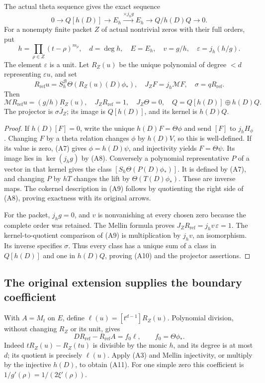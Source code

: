 \begin{theorem}
The actual theta sequence gives the exact sequence
\[
 0\longrightarrow Q[h(D)]\longrightarrow E_h
       \xrightarrow{\times j_hg}E_h
       \longrightarrow Q/h(D)Q\longrightarrow0 .
 \tag{A9}
\]
For a nonempty finite packet \(Z\) of actual nontrivial zeros
with their full orders,
put
\[
 h=\prod_{\rho\in Z}(t-\rho)^{m_\rho},\quad d=\deg h,\quad
 E=E_h,\quad v=g/h,\quad \varepsilon=j_h(h/g).
\]
The element \(\varepsilon\) is a unit. Let \(R_Z(u)\) be the unique
polynomial of degree \(<d\) representing \(\varepsilon u\), and set
\[
 R_{\mathrm{ref}}u=S_h^{\mathscr B}\Theta(R_Z(u)(D)\phi_*),\quad
 J_ZF=j_h\mathcal MF,\quad \sigma=qR_{\mathrm{ref}} .
\]
Then
\[
 \mathcal M R_{\mathrm{ref}}u=(g/h)R_Z(u),\quad J_ZR_{\mathrm{ref}}=1,\quad J_Z\Theta=0,
 \quad Q=Q[h(D)]\oplus h(D)Q .
 \tag{A10}
\]
The projector is \(\sigma\overline J_Z\); its image is \(Q[h(D)]\),
and its kernel is \(h(D)Q\).
\end{theorem}
\begin{proof}
If \(h(D)[F]=0\), write the unique
\(h(D)F=\Theta\phi\) and send \([F]\) to \(j_hH_\phi\).
Changing \(F\) by a theta relation changes \(\phi\) by \(h(D)V\),
so this is well-defined. If its value is zero, (A7) gives
\(\phi=h(D)\psi\), and injectivity yields \(F=\Theta\psi\).
Its image lies in \(\ker(j_hg)\) by (A8).
Conversely a polynomial representative \(P\) of a vector in that
kernel gives the class \([S_h\Theta(P(D)\phi_*)]\).
It is defined by (A7), and changing \(P\) by \(hT\) changes the lift
by \(\Theta(T(D)\phi_*)\). These are inverse maps.
The cokernel description in (A9) follows by quotienting the
right side of (A8), proving exactness with its original arrows.

For the packet, \(j_hg=0\), and \(v\) is nonvanishing at every
chosen zero because the complete order was retained. The Mellin
formula proves \(J_ZR_{\mathrm{ref}}=j_hv\,\varepsilon=1\).
The kernel-to-quotient comparison of (A9) is multiplication by
\(j_hv\), an isomorphism. Its inverse specifies \(\sigma\).
Thus every class has a unique sum of a class in \(Q[h(D)]\)
and one in \(h(D)Q\), proving (A10) and the projector assertions.
\end{proof}

\subsection{The original extension supplies the boundary coefficient}
With \(A=M_t\) on \(E\), define
\(\ell(u)=[t^{d-1}]R_Z(u)\).
Polynomial division, without changing \(R_Z\) or its unit, gives
\[
 DR_{\mathrm{ref}}-R_{\mathrm{ref}}A=f_0\ell,\qquad f_0=\Theta\phi_* .
 \tag{A11}
\]
Indeed \(tR_Z(u)-R_Z(tu)\) is divisible by the monic \(h\),
and its degree is at most \(d\); its quotient is precisely \(\ell(u)\).
Apply (A3) and Mellin injectivity, or multiply by the injective
\(h(D)\), to obtain (A11).
For one simple zero this coefficient is \(1/g'(\rho)=1/(2\xi'(\rho))\).

